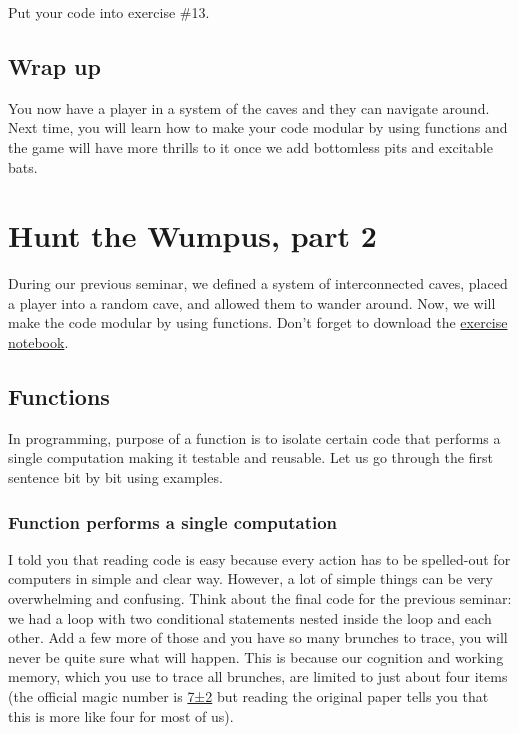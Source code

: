 \documentclass[
]{book}
\begin{document}
Put your code into exercise \#13.

\hypertarget{wrap-up-1}{%
\section{Wrap up}\label{wrap-up-1}}

You now have a player in a system of the caves and they can navigate around. Next time, you will learn how to make your code modular by using functions and the game will have more thrills to it once we add bottomless pits and excitable bats.

\hypertarget{seminar05}{%
\chapter{Hunt the Wumpus, part 2}\label{seminar05}}

During our previous seminar, we defined a system of interconnected caves, placed a player into a random cave, and allowed them to wander around. Now, we will make the code modular by using functions. Don't forget to download the \href{notebooks/Seminar\%2005.\%20Hunt\%20the\%20Wumpus,\%20part\%202.ipynb}{exercise notebook}.

\hypertarget{function}{%
\section{Functions}\label{function}}

In programming, purpose of a function is to isolate certain code that performs a single computation making it testable and reusable. Let us go through the first sentence bit by bit using examples.

\hypertarget{function-performs-a-single-computation}{%
\subsection*{Function performs a single computation}\label{function-performs-a-single-computation}}

I told you that reading code is easy because every action has to be spelled-out for computers in simple and clear way. However, a lot of simple things can be very overwhelming and confusing. Think about the final code for the previous seminar: we had a loop with two conditional statements nested inside the loop and each other. Add a few more of those and you have so many brunches to trace, you will never be quite sure what will happen. This is because our cognition and working memory, which you use to trace all brunches, are limited to just about four items (the official magic number is \href{https://en.wikipedia.org/wiki/The_Magical_Number_Seven,_Plus_or_Minus_Two}{7±2} but reading the original paper tells you that this is more like four for most of us).
\end{document}
